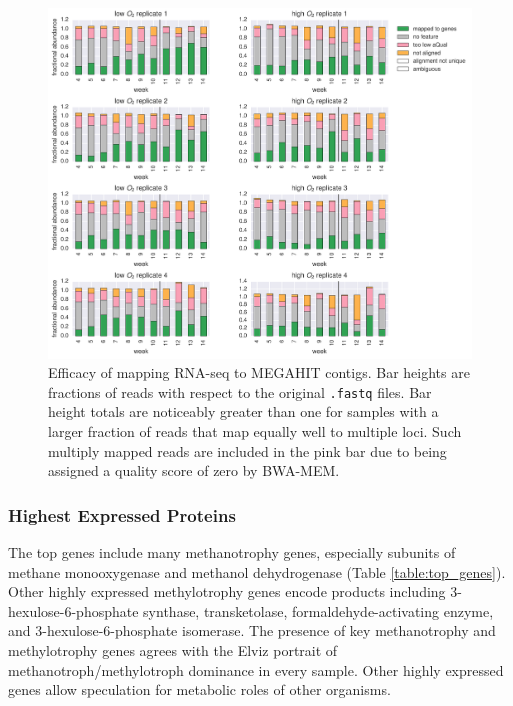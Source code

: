 \begin{figure}[H]
\centering
    \includegraphics[width=1.0\textwidth]{./tex/chapter2/figures/170316_fracs_mapped_unmapped_etc.pdf}
    \begin{singlespace}
    \caption[Efficacy of mapping RNA-seq to MEGAHIT contigs]{
        Efficacy of mapping RNA-seq to MEGAHIT contigs.
        Bar heights are fractions of reads with respect to the original \texttt{.fastq} files.
        Bar height totals are noticeably greater than one for samples with a larger fraction of reads that map equally well to multiple loci.
        Such multiply mapped reads are included in the pink bar due to being assigned a quality score of zero by BWA-MEM.
        }
    \label{fig:rna_mapping_bars}
    \end{singlespace}
\end{figure}

\subsubsection{Highest Expressed Proteins}

The top genes include many methanotrophy genes, especially subunits of methane monooxygenase and methanol dehydrogenase (Table \ref{table:top_genes}).
Other highly expressed methylotrophy genes encode products including 3-hexulose-6-phosphate synthase, transketolase, formaldehyde-activating enzyme, and 3-hexulose-6-phosphate isomerase.
The presence of key methanotrophy and methylotrophy genes agrees with the Elviz portrait of methanotroph/methylotroph dominance in every sample.
Other highly expressed genes allow speculation for metabolic roles of other organisms.

